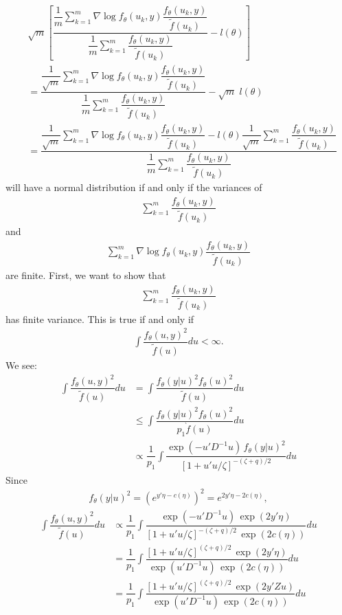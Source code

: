 \documentclass{article}
\begin{document}
\begin{align}
&\sqrt{m} \left[  \dfrac{\dfrac{1}{m}\sum_{k=1}^m    \nabla \log f_\theta(u_k,y)   \dfrac{f_\theta(u_k,y)}{\tilde{f}(u_k)} }{\dfrac{1}{m} \sum_{k=1}^m  \dfrac{f_\theta(u_k,y)}{\tilde{f}(u_k)}  }- l(\theta)  \right] \\
&=
\dfrac{\dfrac{1}{\sqrt{m}}\sum_{k=1}^m     \nabla \log f_\theta(u_k,y)   \dfrac{f_\theta(u_k,y)}{\tilde{f}(u_k)} }{\dfrac{1}{m} \sum_{k=1}^m  \dfrac{f_\theta(u_k,y)}{\tilde{f}(u_k)} }- \sqrt{m}\;  l(\theta)  \\
&=\dfrac{\dfrac{1}{\sqrt{m}}\sum_{k=1}^m     \nabla \log f_\theta(u_k,y)   \dfrac{f_\theta(u_k,y)}{\tilde{f}(u_k)} 
 - l(\theta) \dfrac{1}{\sqrt{m}}\sum_{k=1}^m  \dfrac{f_\theta(u_k,y)}{\tilde{f}(u_k)} }{\dfrac{1}{m} \sum_{k=1}^m  \dfrac{f_\theta(u_k,y)}{\tilde{f}(u_k)} }   
\end{align}
will have a normal distribution if and only if the variances of
\begin{align}
\sum_{k=1}^m  \dfrac{f_\theta(u_k,y)}{\tilde{f}(u_k)}
\end{align}
and
\begin{align}
\sum_{k=1}^m     \nabla \log f_\theta(u_k,y)\dfrac{f_\theta(u_k,y)}{\tilde{f}(u_k)} 
\end{align}
are finite.
First, we want to show that
\begin{align}
\sum_{k=1}^m \dfrac{f_\theta(u_k,y)}{\tilde{f}(u_k)}
\end{align}
has finite variance. This is true if and only if 
\begin{align}
\int \dfrac{f_\theta(u,y)^2}{\tilde{f}(u)} du < \infty.
\end{align}
We see:
\begin{align}
\int \dfrac{f_\theta(u,y)^2}{\tilde{f}(u)} du &=\int \dfrac{f_\theta(y|u)^2 f_\theta(u)^2}{\tilde{f}(u)} du\\
&\leq \int \dfrac{f_\theta(y|u)^2 f_\theta(u)^2}{p_1 \grave{f}(u)} du\\
&\propto \dfrac{1}{p_1} \int \dfrac{\exp(-u'D^{-1}u) \, f_\theta(y|u)^2  }{\left[ 1+u'u/\zeta  \right]^{-(\zeta+q)/2}} du
\end{align}
Since
\begin{align}
f_\theta(y|u)^2=\left( e^{y'\eta-c(\eta)} \right)^2 = e^{2y'\eta-2c(\eta)} ,
\end{align}
\begin{align}
\int \dfrac{f_\theta(u,y)^2}{\tilde{f}(u)} du &\propto \dfrac{1}{p_1} \int \dfrac{\exp(-u'D^{-1}u) \, \exp(2y'\eta)  }{\left[ 1+u'u/\zeta  \right]^{-(\zeta+q)/2} \,  \exp(2c(\eta))  } du\\
&=\dfrac{1}{p_1} \int \dfrac{ \left[ 1+u'u/\zeta  \right]^{(\zeta+q)/2} \, \exp(2y'\eta)  }{\exp(u'D^{-1}u)   \,  \exp(2c(\eta))  } du \\
&=\dfrac{1}{p_1} \int \dfrac{ \left[ 1+u'u/\zeta  \right]^{(\zeta+q)/2} \, \exp(2y'Zu)  }{\exp(u'D^{-1}u)   \,  \exp(2c(\eta))  } du 
\end{align}
\end{document}
